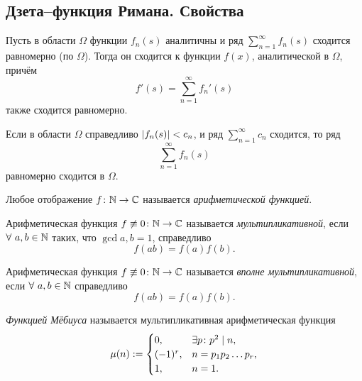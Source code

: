 \subsection{Дзета--функция Римана. Свойства}
\label{subsec:3_Zeta-function-properties}

\begin{theorem}[Вейерштрасса]
	Пусть в области $\Omega$ функции $f_n(s)$ аналитичны и ряд $\sum_{n=1}^\infty f_n(s)$ сходится равномерно (по $\Omega$). Тогда он сходится к функции $f(x)$, аналитической в $\Omega$, причём
	\[
	    f'(s) = \sum_{n=1}^\infty f_n'(s)
	\]
	также сходится равномерно.
\end{theorem}

\begin{test}[Вейерштрасса]
	Если в области $\Omega$ справедливо $\left| f_n(s) \right| < c_n$, и ряд $\sum_{n=1}^\infty c_n$ сходится, то ряд
	\[
	    \sum_{n=1}^\infty f_n(s)
	\]
	равномерно сходится в $\Omega$.
\end{test}

\begin{ndefinition}
\label{def:I_arithmetic-function}
	Любое отображение $f\colon \mathbb{N} \to \mathbb{C}$ называется \emph{арифметической функцией}.
\end{ndefinition}

\begin{ndefinition}
\label{def:I_multiplicative-function}
	Арифметическая функция $f \not\equiv 0\colon \mathbb{N} \to \mathbb{C}$ называется \emph{мультипликативной}, если $\forall~a, b \in \mathbb{N}$ таких, что $\gcd{a, b} = 1$, справедливо
	\[
		f(ab) = f(a)f(b).
	\]
\end{ndefinition}

\begin{ndefinition}
\label{def:I_completely-multiplicative-function}
	Арифметическая функция $f \not\equiv 0\colon \mathbb{N} \to \mathbb{C}$ называется \emph{вполне мультипликативной}, если $\forall~a, b \in \mathbb{N}$ справедливо
	\[
		f(ab) = f(a)f(b).
	\]
\end{ndefinition}

\begin{ndefinition}
\label{def:I_Mobius-function}
	\emph{Функцией Мёбиуса} называется мультипликативная арифметическая функция
	\[
	    \mu(n) := 
	    \begin{cases}
	    	0, & \exists p\colon p^2 \mid n, \\
	    	(-1)^r, & n = p_1p_2 \dots p_r, \\
	    	1, & n = 1.
	    \end{cases}
	\]
\end{ndefinition}

